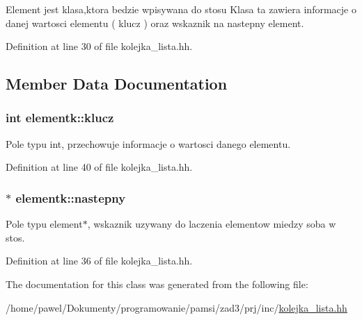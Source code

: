 Element jest klasa,ktora bedzie wpisywana do stosu Klasa ta zawiera informacje o danej wartosci elementu ( klucz ) oraz wskaznik na nastepny element. 

Definition at line 30 of file kolejka\-\_\-lista.\-hh.



\subsection{Member Data Documentation}
\hypertarget{classelementk_a80de941ecbf60bd5189d1c1005c68203}{
\subsubsection[{klucz}]{\setlength{\rightskip}{0pt plus 5cm}int elementk\-::klucz}}\label{classelementk_a80de941ecbf60bd5189d1c1005c68203}


Pole typu int, przechowuje informacje o wartosci danego elementu. 



Definition at line 40 of file kolejka\-\_\-lista.\-hh.

\hypertarget{classelementk_a651594e4ecff4a674b7df913b68b1d55}{
\subsubsection[{nastepny}]{$\ast$ elementk\-::nastepny}}\label{classelementk_a651594e4ecff4a674b7df913b68b1d55}


Pole typu element$\ast$, wskaznik uzywany do laczenia elementow miedzy soba w stos. 



Definition at line 36 of file kolejka\-\_\-lista.\-hh.



The documentation for this class was generated from the following file\-:\begin{DoxyCompactItemize}
\item 
/home/pawel/\-Dokumenty/programowanie/pamsi/zad3/prj/inc/\hyperlink{kolejka__lista_8hh}{kolejka\-\_\-lista.\-hh}\end{DoxyCompactItemize}
